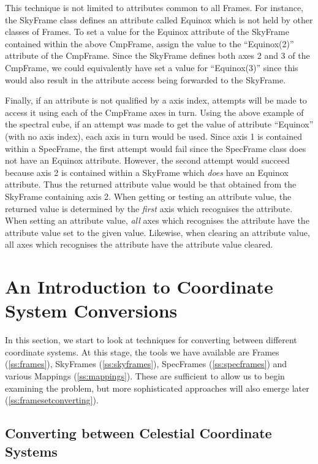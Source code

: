 \documentclass[twoside,11pt]{article}
\newcommand{\secref}[1]{\S\ref{#1}}
\renewcommand{\secref}[1]{\ref{#1}}
\begin{document}
This technique is not limited to attributes common to all Frames. For
instance, the SkyFrame class defines an attribute called Equinox which is
not held by other classes of Frames. To set a value for the Equinox
attribute of the SkyFrame contained within the above CmpFrame, assign the
value to the ``Equinox(2)'' attribute of the CmpFrame. Since the SkyFrame
defines both axes 2 and 3 of the CmpFrame, we could equivalently have set
a value for ``Equinox(3)'' since this would also result in the attribute
access being forwarded to the SkyFrame.

Finally, if an attribute is not qualified by a axis index, attempts will
be made to access it using each of the CmpFrame axes in turn. Using the
above example of the spectral cube, if an attempt was made to get the
value of attribute ``Equinox'' (with no axis index), each axis in turn
would be used. Since axis 1 is contained within a SpecFrame, the first
attempt would fail since the SpecFrame class does not have an Equinox
attribute. However, the second attempt would succeed because axis 2 is
contained within a SkyFrame which \emph{does} have an Equinox attribute. Thus
the returned attribute value would be that obtained from the SkyFrame
containing axis 2. When getting or testing an attribute value, the
returned value is determined by the \emph{first} axis which recognises
the attribute. When setting an attribute value, \emph{all} axes
which recognises the attribute have the attribute value set to the given
value. Likewise, when clearing an attribute value, all axes
which recognises the attribute have the attribute value cleared.

\cleardoublepage
\section{\label{ss:introducingconversion}An Introduction to Coordinate System Conversions}

In this section, we start to look at techniques for converting between
different coordinate systems.  At this stage, the tools we have available
are Frames (\secref{ss:frames}), SkyFrames (\secref{ss:skyframes}),
SpecFrames (\secref{ss:specframes}) and various Mappings
(\secref{ss:mappings}). These are sufficient to allow us to begin
examining the problem, but more sophisticated approaches will also emerge
later (\secref{ss:framesetconverting}).

\subsection{\label{ss:convertingskyframes}Converting between Celestial Coordinate Systems}
\end{document}
